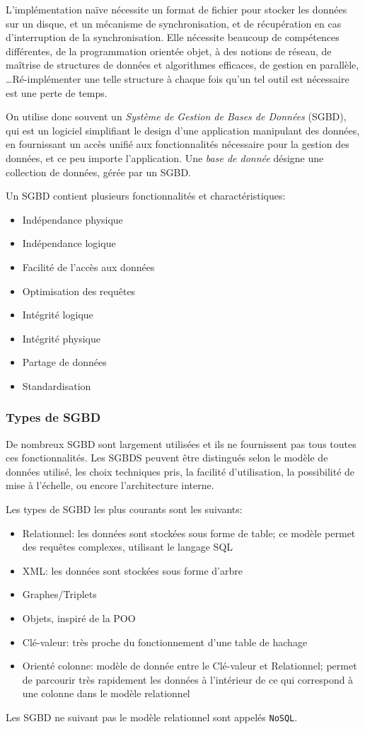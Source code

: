 \documentclass[french, toc]{../cs-classes/cs-classes}
\begin{document}
L'implémentation naïve nécessite un format de fichier pour stocker les données sur un disque, et un mécanisme de synchronisation, et de récupération en cas d'interruption de la synchronisation. Elle nécessite beaucoup de compétences différentes, de la programmation orientée objet, à des notions de réseau, de maîtrise de structures de données et algorithmes efficaces, de gestion en parallèle, \dots Ré-implémenter une telle structure à chaque fois qu'un tel outil est nécessaire est une perte de temps. 

On utilise donc souvent un \emph{Système de Gestion de Bases de Données} (SGBD), qui est un logiciel simplifiant le design d'une application manipulant des données, en fournissant un accès unifié aux fonctionnalités nécessaire pour la gestion des données, et ce peu importe l'application. Une \emph{base de donnée} désigne une collection de données, gérée par un SGBD.

Un SGBD contient plusieurs fonctionnalités et charactéristiques:
\begin{itemize}
    \item Indépendance physique
    \item Indépendance logique
    \item Facilité de l'accès aux données
    \item Optimisation des requêtes
    \item Intégrité logique
    \item Intégrité physique
    \item Partage de données
    \item Standardisation
\end{itemize}

\subsubsection{Types de SGBD}
De nombreux SGBD sont largement utilisées et ils ne fournissent pas tous toutes ces fonctionnalités. Les SGBDS peuvent être distingués selon le modèle de données utilisé, les choix techniques pris, la facilité d'utilisation, la possibilité de mise à l'échelle, ou encore l'architecture interne.

Les types de SGBD les plus courants sont les suivants:
\begin{itemize}
    \item Relationnel: les données sont stockées sous forme de table; ce modèle permet des requêtes complexes, utilisant le langage SQL
    \item XML: les données sont stockées sous forme d'arbre
    \item Graphes/Triplets
    \item Objets, inspiré de la POO
    \item Clé-valeur: très proche du fonctionnement d'une table de hachage
    \item Orienté colonne: modèle de donnée entre le Clé-valeur et Relationnel; permet de parcourir très rapidement les données à l'intérieur de ce qui correspond à une colonne dans le modèle relationnel
\end{itemize}
Les SGBD ne suivant pas le modèle relationnel sont appelés \texttt{NoSQL}.
\end{document}
